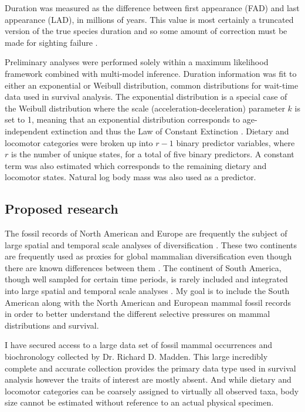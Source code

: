 \documentclass[11pt,letterpaper]{article}
\begin{document}
Duration was measured as the difference between first appearance (FAD) and last appearance (LAD), in millions of years. This value is most certainly a truncated version of the true species duration and so some amount of correction must be made for sighting failure \citep{Alroy2014a,Solow1997,Strauss1989}.

Preliminary analyses were performed solely within a maximum likelihood framework combined with multi-model inference. Duration information was fit to either an exponential or Weibull distribution, common distributions for wait-time data used in survival analysis. The exponential distribution is a special case of the Weibull distribution where the scale (acceleration-deceleration) parameter \(k\) is set to 1, meaning that an exponential distribution corresponds to age-independent extinction and thus the Law of Constant Extinction \citep{VanValen1979}. Dietary and locomotor categories were broken up into \(r - 1\) binary predictor variables, where \(r\) is the number of unique states, for a total of five binary predictors. A constant term was also estimated which corresponds to the remaining dietary and locomotor states. Natural log body mass was also used as a predictor. 


\subsection{Proposed research}
The fossil records of North American and Europe are frequently the subject of large spatial and temporal scale analyses of diversification \citep{Jernvall2004,Jernvall2002,Fortelius2002,Janis2000,Alroy1996a,Alroy1998,Alroy2000g,Liow2008,Raia2006,Tomiya2013}. These two continents are frequently used as proxies for global mammalian diversification even though there are known differences between them \citep{Liow2008,Tomiya2013}. The continent of South America, though well sampled for certain time periods, is rarely included and integrated into large spatial and temporal scale analyses \citep{Stromberg2013,Marshall1982}. My goal is to include the South American along with the North American and European mammal fossil records in order to better understand the different selective pressures on mammal distributions and survival.

I have secured access to a large data set of fossil mammal occurrences and biochronology collected by Dr. Richard D. Madden. This large incredibly complete and accurate collection provides the primary data type used in survival analysis however the traits of interest are mostly absent. And while dietary and locomotor categories can be coarsely assigned to virtually all observed taxa, body size cannot be estimated without reference to an actual physical specimen. 
\end{document}
